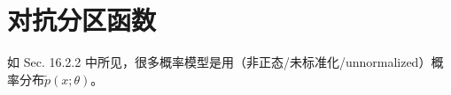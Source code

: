 \chapter{对抗分区函数}
\label{chap:18}


如 Sec. 16.2.2 中所见，很多概率模型是用（非正态/未标准化/unnormalized）概率分布\(\widetilde{p}(x;\theta)\)。